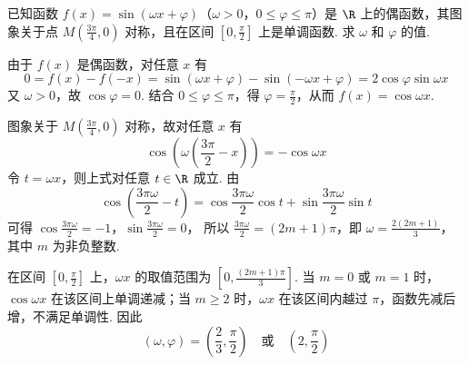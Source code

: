 \begin{problem}
已知函数 \(f(x) = \sin (\omega x + \varphi)\)（\(\omega > 0\)，\(0 \leqslant \varphi \leqslant \pi\)）是 \(\R\) 上的偶函数，其图象关于点 \(M\left(\frac{3\pi}{4}, 0\right)\) 对称，且在区间 \(\left[0, \frac{\pi}{2}\right]\) 上是单调函数. 求 \(\omega\) 和 \(\varphi\) 的值.

\begin{solution}
由于 \(f(x)\) 是偶函数，对任意 \(x\) 有
\[
0=f(x)-f(-x)=\sin(\omega x+\varphi)-\sin(-\omega x+\varphi)=2\cos\varphi\sin\omega x
\]
又 \(\omega>0\)，故 \(\cos\varphi=0\). 结合 \(0\leqslant\varphi\leqslant\pi\)，得 \(\varphi=\frac{\pi}{2}\)，从而 \(f(x)=\cos\omega x\).

图象关于 \(M\left(\frac{3\pi}{4},0\right)\) 对称，故对任意 \(x\) 有
\[
\cos\left(\omega\left(\frac{3\pi}{2}-x\right)\right)=-\cos\omega x
\]
令 \(t=\omega x\)，则上式对任意 \(t\in\R\) 成立. 由
\[
\cos\left(\frac{3\pi\omega}{2}-t\right)=\cos\frac{3\pi\omega}{2}\cos t+\sin\frac{3\pi\omega}{2}\sin t
\]
可得
\(\cos\frac{3\pi\omega}{2}=-1\)，\(\sin\frac{3\pi\omega}{2}=0\)，
所以 \(\frac{3\pi\omega}{2}=(2m+1)\pi\)，即 \(\omega=\frac{2(2m+1)}{3}\)，其中 \(m\) 为非负整数.

在区间 \(\left[0,\frac{\pi}{2}\right]\) 上，\(\omega x\) 的取值范围为 \(\left[0,\frac{(2m+1)\pi}{3}\right]\). 当 \(m=0\) 或 \(m=1\) 时，\(\cos\omega x\) 在该区间上单调递减；当 \(m\geqslant2\) 时，\(\omega x\) 在该区间内越过 \(\pi\)，函数先减后增，不满足单调性. 因此
\[
(\omega,\varphi)=\left(\frac{2}{3},\frac{\pi}{2}\right)\quad\text{或}\quad\left(2,\frac{\pi}{2}\right)
\]
\end{solution}
\end{problem}

